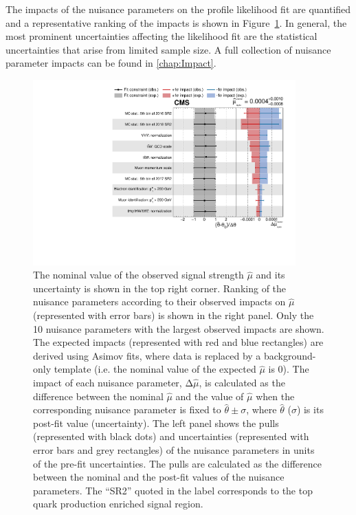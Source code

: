 The impacts of the nuisance parameters on the profile likelihood fit are quantified and a representative ranking of the impacts is shown in Figure~\ref{fig:Impact}. In general, the most prominent uncertainties affecting the likelihood fit are the statistical uncertainties that arise from limited sample size. A full collection of nuisance parameter impacts can be found in \autoref{chap:Impact}.

\begin{figure}[tbh!] 
\begin{center}
\includegraphics[width=0.9\textwidth]{figures/Part3/Results/Impact_VecU}
 \caption{The nominal value of the observed signal strength $\hat{\mu}$ and its uncertainty is shown in the top right corner. Ranking of the nuisance parameters according to their observed impacts on $\hat{\mu}$ (represented with error bars) is shown in the right panel. Only the 10 nuisance parameters with the largest observed impacts are shown. The expected impacts (represented with red and blue rectangles) are derived using Asimov fits, where data is replaced by a background-only template (i.e. the nominal value of the expected $\hat{\mu}$ is 0). The impact of each nuisance parameter, $\mathrm{\Delta}\hat{\mu}$, is calculated as the difference between the nominal $\hat{\mu}$ and the value of $\hat{\mu}$ when the corresponding nuisance parameter is fixed to $\hat{\theta}\pm\sigma$, where $\hat{\theta}$ ($\sigma$) is its post-fit value (uncertainty). The left panel shows the pulls (represented with black dots) and uncertainties (represented with error bars and grey rectangles) of the nuisance parameters in units of the pre-fit uncertainties. The pulls are calculated as the difference between the nominal and the post-fit values of the nuisance parameters. The ``\ac{SR}2'' quoted in the label corresponds to the top quark production enriched signal region.}
 \label{fig:Impact}
 \end{center}
\end{figure}

